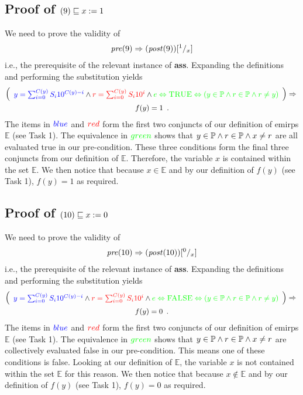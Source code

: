 \documentclass[headings=small,a4paper,12pt]{scrartcl}
\newcommand{\pre}{\mathit{pre}}
\newcommand{\post}{\mathit{post}}
\newcommand{\emirp}{\mathbb{E}}
\newcommand{\primeset}{\mathbb{P}}
\begin{document}
\subsection{Proof of $(9)\sqsubseteq x\mathrel{:=} 1$}
\label{sec:proof9ass}

We need to prove the validity of
\begin{gather*}
  \pre(9) \Implies (\post(9))\subst{1}x
\end{gather*}
i.e., the prerequisite of the relevant instance of \textbf{ass}.
Expanding the definitions and performing the substitution yields
\begin{gather*}
  \left(
    \begin{array}{l}
      {\color{blue}y=\sum_{i=0}^{C(y)} S_i 10^{C(y)-i}}\And {\color{red}r=\sum_{i=0}^{C(y)} S_i 10^i}\And {\color{green}e\EQUIV\textsc{TRUE}\EQUIV(y\in\primeset\And r\in\primeset\And r\neq y)}
    \end{array}
  \right) \Implies{}\\
  f(y)=1\enskip.
\end{gather*}
The items in ${\color{blue}blue}$ and ${\color{red}red}$ form the first two conjuncts of our definition of emirps $\emirp$ (see Task 1). The equivalence in ${\color{green}green}$ shows that $y\in\primeset\And r\in\primeset \And x\neq r$ are all evaluated true in our pre-condition.  These three conditions form the final three conjuncts from our definition of $\emirp$.  Therefore, the variable $x$ is contained within the set $\emirp$. We then notice that because $x\in\emirp$ and by our definition of $f(y)$ (see Task 1), $f(y)=1$ as required.

\subsection{Proof of $(10)\sqsubseteq x\mathrel{:=} 0$}
\label{sec:proof10ass}

We need to prove the validity of
\begin{gather*}
  \pre(10) \Implies (\post(10))\subst{0}x
\end{gather*}
i.e., the prerequisite of the relevant instance of \textbf{ass}.
Expanding the definitions and performing the substitution yields
\begin{gather*}
  \left(
    \begin{array}{l}
      {\color{blue}y=\sum_{i=0}^{C(y)} S_i 10^{C(y)-i}}\And {\color{red}r=\sum_{i=0}^{C(y)} S_i 10^i}\And {\color{green}e\EQUIV\textsc{FALSE}\EQUIV(y\in\primeset\And r\in\primeset\And r\neq y)}
    \end{array}
  \right) \Implies{}\\
  f(y)=0\enskip.
\end{gather*}
The items in ${\color{blue}blue}$ and ${\color{red}red}$ form the first two conjuncts of our definition of emirps $\emirp$ (see Task 1). The equivalence in ${\color{green}green}$ shows that $y\in\primeset\And r\in\primeset \And x\neq r$ are collectively evaluated false in our pre-condition.  This means one of these conditions is false.  Looking at our definition of $\emirp$, the variable $x$ is not contained within the set $\emirp$ for this reason. We then notice that because $x\notin\emirp$ and by our definition of $f(y)$ (see Task 1), $f(y)=0$ as required.
\end{document}
